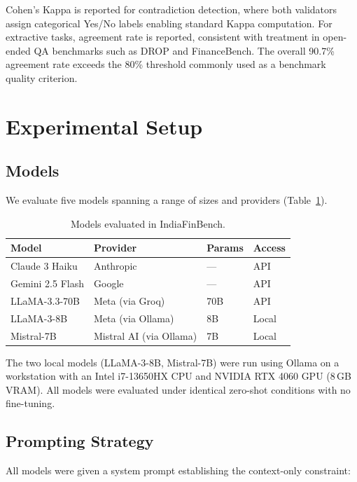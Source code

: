 \documentclass[11pt]{article}
\begin{document}
Cohen's Kappa is reported for contradiction detection, where both validators
assign categorical Yes/No labels enabling standard Kappa computation. For
extractive tasks, agreement rate is reported, consistent with treatment in
open-ended QA benchmarks such as DROP \citep{dua2019drop} and FinanceBench.
The overall 90.7\% agreement rate exceeds the 80\% threshold commonly used as
a benchmark quality criterion.

\section{Experimental Setup}

\subsection{Models}

We evaluate five models spanning a range of sizes and providers
(Table~\ref{tab:models}).

\begin{table}[h]
\centering
\caption{Models evaluated in IndiaFinBench.}
\label{tab:models}
\begin{tabular}{llll}
\toprule
\textbf{Model} & \textbf{Provider} & \textbf{Params} & \textbf{Access} \\
\midrule
Claude 3 Haiku    & Anthropic          & ---  & API   \\
Gemini 2.5 Flash  & Google             & ---  & API   \\
LLaMA-3.3-70B     & Meta (via Groq)    & 70B  & API   \\
LLaMA-3-8B        & Meta (via Ollama)  & 8B   & Local \\
Mistral-7B        & Mistral AI (via Ollama) & 7B & Local \\
\bottomrule
\end{tabular}
\end{table}

The two local models (LLaMA-3-8B, Mistral-7B) were run using Ollama on a
workstation with an Intel i7-13650HX CPU and NVIDIA RTX 4060 GPU (8\,GB VRAM).
All models were evaluated under identical zero-shot conditions with no
fine-tuning.

\subsection{Prompting Strategy}

All models were given a system prompt establishing the context-only constraint:
\end{document}
